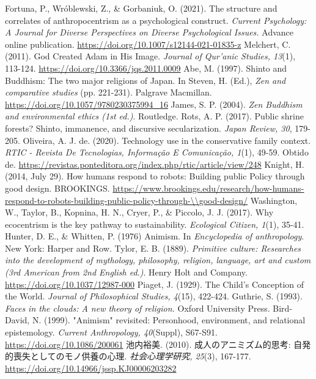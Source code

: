 \documentclass[a4j,12pt]{jreport}
\begin{document}
\begin{thebibliography}{999}
 Fortuna, P., Wr\'{o}blewski, Z., \& Gorbaniuk, O. (2021). The structure and correlates of anthropocentrism as a psychological construct. \textsl{Current Psychology: A Journal for Diverse Perspectives on Diverse Psychological Issues.} Advance online publication. \url{https://doi.org/10.1007/s12144-021-01835-z}
 Melchert, C. (2011). God Created Adam in His Image. \textsl{Journal of Qur'anic Studies, 13}(1), 113-124. \url{https://doi.org/10.3366/jqs.2011.0009}
 Abe, M. (1997). Shinto and Buddhism: The two major religions of Japan. In Steven, H. (Ed.), \textsl{Zen and comparative studies} (pp. 221-231). Palgrave Macmillan. \url{https://doi.org/10.1057/9780230375994_16}
 James, S. P. (2004). \textsl{Zen Buddhism and environmental ethics (1st ed.)}. Routledge.
 Rots, A. P. (2017). Public shrine forests? Shinto, immanence, and discursive secularization. \textsl{Japan Review, 30}, 179-205.
 Oliveira, A. J. de. (2020). Technology use in the conservative family context. \textsl{RTIC - Revista De Tecnologias, Informa\c{c}\~{a}o E Comunica\c{c}\~{a}o, 1}(1), 49-59. Obtido de. \url{https://revistas.ponteditora.org/index.php/rtic/article/view/248}
 Knight, H. (2014, July 29). How humans respond to robots: Building public Policy through good design.  BROOKINGS. \url{https://www.brookings.edu/research/how-humans-respond-to-robots-building-public-policy-through-\\good-design/}
 Washington, W., Taylor, B., Kopnina, H. N., Cryer, P., \& Piccolo, J. J. (2017). Why ecocentrism is the key pathway to sustainability. \textsl{Ecological Citizen, 1}(1), 35-41.
 Hunter, D. E., \& Whitten, P. (1976) Animism. In \textsl{Encyclopedia of anthropology}. New York: Harper and Row.
 Tylor, E. B. (1889). \textsl{Primitive culture: Researches into the development of mythology, philosophy, religion, language, art and custom (3rd American from 2nd English ed.)}. Henry Holt and Company. \url{https://doi.org/10.1037/12987-000}
 Piaget, J. (1929). The Child's Conception of the World. \textsl{Journal of Philosophical Studies, 4}(15), 422-424.
 Guthrie, S. (1993). \textsl{Faces in the clouds: A new theory of religion.} Oxford University Press.
 Bird-David, N. (1999). "Animism" revisited: Personhood, environment, and relational epistemology. \textsl{Current Anthropology, 40}(Suppl), S67-S91. \url{https://doi.org/10.1086/200061}
 池内裕美. (2010). 成人のアニミズム的思考: 自発的喪失としてのモノ供養の心理. \textsl{社会心理学研究, 25}(3), 167-177. \url{https://doi.org/10.14966/jssp.KJ00006203282}

\end{thebibliography}
\end{document}
